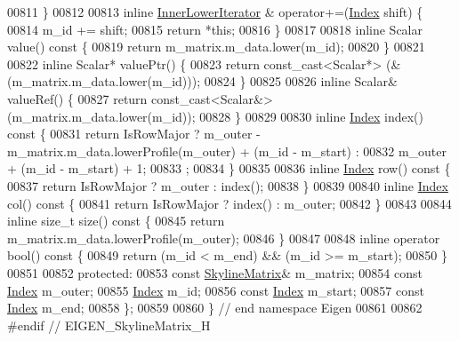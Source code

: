 \begin{DoxyCode}
00811     \}
00812 
00813     \textcolor{keyword}{inline} \hyperlink{class_eigen_1_1_skyline_matrix_1_1_inner_lower_iterator}{InnerLowerIterator} & operator+=(\hyperlink{group___core___module_a554f30542cc2316add4b1ea0a492ff02}{Index} shift) \{
00814         m\_id += shift;
00815         \textcolor{keywordflow}{return} *\textcolor{keyword}{this};
00816     \}
00817 
00818     \textcolor{keyword}{inline} Scalar value()\textcolor{keyword}{ const }\{
00819         \textcolor{keywordflow}{return} m\_matrix.m\_data.lower(m\_id);
00820     \}
00821 
00822     \textcolor{keyword}{inline} Scalar* valuePtr() \{
00823         \textcolor{keywordflow}{return} \textcolor{keyword}{const\_cast<}Scalar*\textcolor{keyword}{>} (&(m\_matrix.m\_data.lower(m\_id)));
00824     \}
00825 
00826     \textcolor{keyword}{inline} Scalar& valueRef() \{
00827         \textcolor{keywordflow}{return} \textcolor{keyword}{const\_cast<}Scalar&\textcolor{keyword}{>} (m\_matrix.m\_data.lower(m\_id));
00828     \}
00829 
00830     \textcolor{keyword}{inline} \hyperlink{group___core___module_a554f30542cc2316add4b1ea0a492ff02}{Index} index()\textcolor{keyword}{ const }\{
00831         \textcolor{keywordflow}{return} IsRowMajor ? m\_outer - m\_matrix.m\_data.lowerProfile(m\_outer) + (m\_id - m\_start) :
00832                 m\_outer + (m\_id - m\_start) + 1;
00833         ;
00834     \}
00835 
00836     \textcolor{keyword}{inline} \hyperlink{group___core___module_a554f30542cc2316add4b1ea0a492ff02}{Index} row()\textcolor{keyword}{ const }\{
00837         \textcolor{keywordflow}{return} IsRowMajor ? m\_outer : index();
00838     \}
00839 
00840     \textcolor{keyword}{inline} \hyperlink{group___core___module_a554f30542cc2316add4b1ea0a492ff02}{Index} col()\textcolor{keyword}{ const }\{
00841         \textcolor{keywordflow}{return} IsRowMajor ? index() : m\_outer;
00842     \}
00843 
00844     \textcolor{keyword}{inline} \textcolor{keywordtype}{size\_t} size()\textcolor{keyword}{ const }\{
00845         \textcolor{keywordflow}{return} m\_matrix.m\_data.lowerProfile(m\_outer);
00846     \}
00847 
00848     \textcolor{keyword}{inline} \textcolor{keyword}{operator} bool()\textcolor{keyword}{ const }\{
00849         \textcolor{keywordflow}{return} (m\_id < m\_end) && (m\_id >= m\_start);
00850     \}
00851 
00852 \textcolor{keyword}{protected}:
00853     \textcolor{keyword}{const} \hyperlink{class_eigen_1_1_skyline_matrix}{SkylineMatrix}& m\_matrix;
00854     \textcolor{keyword}{const} \hyperlink{group___core___module_a554f30542cc2316add4b1ea0a492ff02}{Index} m\_outer;
00855     \hyperlink{group___core___module_a554f30542cc2316add4b1ea0a492ff02}{Index} m\_id;
00856     \textcolor{keyword}{const} \hyperlink{group___core___module_a554f30542cc2316add4b1ea0a492ff02}{Index} m\_start;
00857     \textcolor{keyword}{const} \hyperlink{group___core___module_a554f30542cc2316add4b1ea0a492ff02}{Index} m\_end;
00858 \};
00859 
00860 \} \textcolor{comment}{// end namespace Eigen}
00861 
00862 \textcolor{preprocessor}{#endif // EIGEN\_SkylineMatrix\_H}
\end{DoxyCode}
